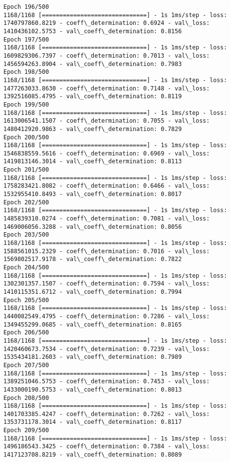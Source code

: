 \documentclass[11pt]{article}
\begin{document}
\begin{Verbatim}[commandchars=\\\{\}]
Epoch 196/500
1168/1168 [==============================] - 1s 1ms/step - loss: 1740797860.8219 - coeff\_determination: 0.6924 - val\_loss: 1410436102.5753 - val\_coeff\_determination: 0.8156
Epoch 197/500
1168/1168 [==============================] - 1s 1ms/step - loss: 1609829306.7397 - coeff\_determination: 0.7013 - val\_loss: 1456594263.8904 - val\_coeff\_determination: 0.7983
Epoch 198/500
1168/1168 [==============================] - 1s 1ms/step - loss: 1477263033.8630 - coeff\_determination: 0.7148 - val\_loss: 1392516085.4795 - val\_coeff\_determination: 0.8119
Epoch 199/500
1168/1168 [==============================] - 1s 1ms/step - loss: 1613006541.1507 - coeff\_determination: 0.7055 - val\_loss: 1480412920.9863 - val\_coeff\_determination: 0.7829
Epoch 200/500
1168/1168 [==============================] - 1s 1ms/step - loss: 1546838559.5616 - coeff\_determination: 0.6969 - val\_loss: 1419813146.3014 - val\_coeff\_determination: 0.8113
Epoch 201/500
1168/1168 [==============================] - 1s 1ms/step - loss: 1758283421.8082 - coeff\_determination: 0.6466 - val\_loss: 1532955410.8493 - val\_coeff\_determination: 0.8017
Epoch 202/500
1168/1168 [==============================] - 1s 1ms/step - loss: 1485839310.0274 - coeff\_determination: 0.7081 - val\_loss: 1469006056.3288 - val\_coeff\_determination: 0.8056
Epoch 203/500
1168/1168 [==============================] - 1s 1ms/step - loss: 1588561015.2329 - coeff\_determination: 0.7016 - val\_loss: 1569802517.9178 - val\_coeff\_determination: 0.7822
Epoch 204/500
1168/1168 [==============================] - 1s 1ms/step - loss: 1302301357.1507 - coeff\_determination: 0.7594 - val\_loss: 1410115351.6712 - val\_coeff\_determination: 0.7994
Epoch 205/500
1168/1168 [==============================] - 1s 1ms/step - loss: 1440082549.4795 - coeff\_determination: 0.7286 - val\_loss: 1349455299.0685 - val\_coeff\_determination: 0.8165
Epoch 206/500
1168/1168 [==============================] - 1s 1ms/step - loss: 1420460673.7534 - coeff\_determination: 0.7239 - val\_loss: 1535434181.2603 - val\_coeff\_determination: 0.7989
Epoch 207/500
1168/1168 [==============================] - 1s 1ms/step - loss: 1389251046.5753 - coeff\_determination: 0.7453 - val\_loss: 1433000190.5753 - val\_coeff\_determination: 0.8013
Epoch 208/500
1168/1168 [==============================] - 1s 1ms/step - loss: 1401703385.4247 - coeff\_determination: 0.7262 - val\_loss: 1353731178.3014 - val\_coeff\_determination: 0.8117
Epoch 209/500
1168/1168 [==============================] - 1s 1ms/step - loss: 1496186543.3425 - coeff\_determination: 0.7384 - val\_loss: 1417123708.8219 - val\_coeff\_determination: 0.8089

\end{Verbatim}
\end{document}
